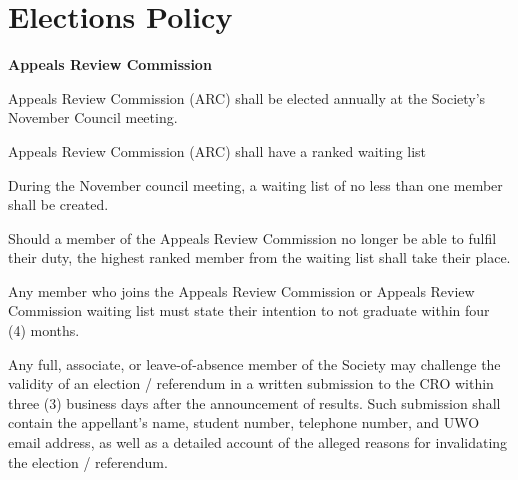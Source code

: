 \section{Elections Policy}
\begin{longenum}[ label*=\thesection.\arabic*., align=left]
 \item \textbf{Appeals Review Commission}
 \begin{longenum}[label*=\arabic*., align=left]
  \item Appeals Review Commission (ARC) shall be elected annually at the Society's November Council meeting.
  \item Appeals Review Commission (ARC) shall have a ranked waiting list
  \begin{longenum}[label*=\arabic*., align=left]
  	\item  During the November council meeting, a waiting list of no less than one member shall be created.
  	\item Should a member of the Appeals Review Commission no longer be able to fulfil their duty, the highest ranked member from the waiting list shall take their place.
  \end{longenum}
  \item Any member who joins the Appeals Review Commission or Appeals Review Commission waiting list must state their intention to not graduate within four (4) months.
  \item Any full, associate, or leave-of-absence member of the Society may challenge the validity of an election / referendum in a written submission to the CRO within three (3) business days after the announcement of results. Such submission shall contain the appellant's name, student number, telephone number, and UWO email address, as well as a detailed account of the alleged reasons for invalidating the election / referendum.
  \end{longenum}


\end{longenum}

